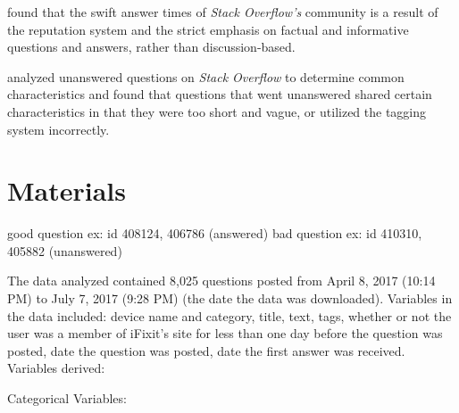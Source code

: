 \documentclass[12pt]{article}
\begin{document}
    \citep{Mamykina2011} found that the swift answer times of \textit{Stack Overflow's} community is a result of the reputation system and the strict emphasis on factual and informative questions and answers, rather than discussion-based. 

    \citep{Asaduzzaman2013} analyzed unanswered questions on \textit{Stack Overflow} to determine common characteristics and found that questions that went unanswered shared certain characteristics in that they were too short and vague, or utilized the tagging system incorrectly. 


\section{Materials}

good question ex: id 408124, 406786 (answered)
bad question ex: id 410310, 405882 (unanswered) 

The data analyzed contained 8,025 questions posted from April 8, 2017 (10:14 PM) to July 7, 2017 (9:28 PM) (the date the data was downloaded). Variables in the data included: device name and category, title, text, tags, whether or not the user was a member of iFixit's site for less than one day before the question was posted, date the question was posted, date the first answer was received. Variables derived: 

Categorical Variables: 
\end{document}
